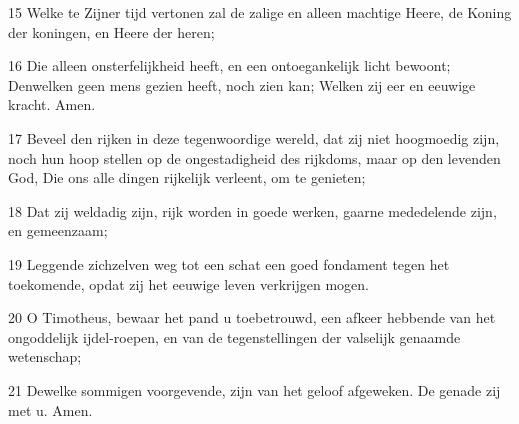 \par 15 Welke te Zijner tijd vertonen zal de zalige en alleen machtige Heere, de Koning der koningen, en Heere der heren;
\par 16 Die alleen onsterfelijkheid heeft, en een ontoegankelijk licht bewoont; Denwelken geen mens gezien heeft, noch zien kan; Welken zij eer en eeuwige kracht. Amen.
\par 17 Beveel den rijken in deze tegenwoordige wereld, dat zij niet hoogmoedig zijn, noch hun hoop stellen op de ongestadigheid des rijkdoms, maar op den levenden God, Die ons alle dingen rijkelijk verleent, om te genieten;
\par 18 Dat zij weldadig zijn, rijk worden in goede werken, gaarne mededelende zijn, en gemeenzaam;
\par 19 Leggende zichzelven weg tot een schat een goed fondament tegen het toekomende, opdat zij het eeuwige leven verkrijgen mogen.
\par 20 O Timotheus, bewaar het pand u toebetrouwd, een afkeer hebbende van het ongoddelijk ijdel-roepen, en van de tegenstellingen der valselijk genaamde wetenschap;
\par 21 Dewelke sommigen voorgevende, zijn van het geloof afgeweken. De genade zij met u. Amen.


